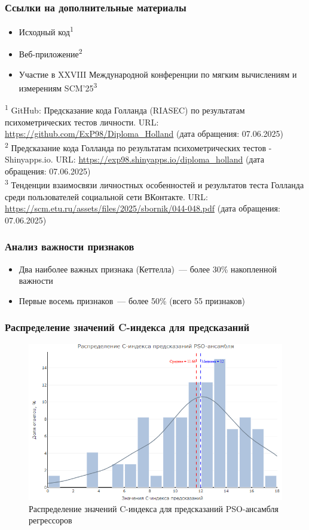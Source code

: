 \documentclass
  [ russian
  , aspectratio=169 %
  ] {beamer}
\begin{document}
\begin{frame}
    \frametitle{Ссылки на дополнительные материалы}
    \begin{itemize}
        \item Исходный код\textsuperscript{1}
        \item Веб-приложение\textsuperscript{2}
        \item Участие в XXVIII Международной конференции по мягким вычислениям и измерениям SCM'25\textsuperscript{3}
    \end{itemize}
    
    \btVFill
    {\footnotesize
        \textsuperscript{1} GitHub: Предсказание кода Голланда (RIASEC) по результатам психометрических тестов личности. URL: \url{https://github.com/ExP98/Diploma_Holland} (дата обращения: 07.06.2025)\\
        \vspace{0.2em}
        \textsuperscript{2} Предсказание кода Голланда по результатам психометрических тестов - Shinyapps.io. URL: \url{https://exp98.shinyapps.io/diploma_holland} (дата обращения: 07.06.2025)\\
        \vspace{0.2em}
        \textsuperscript{3} Тенденции взаимосвязи личностных особенностей и результатов теста Голланда среди пользователей социальной сети ВКонтакте. URL: \url{https://scm.etu.ru/assets/files/2025/sbornik/044-048.pdf} (дата обращения: 07.06.2025)
    }
\end{frame}


\begin{frame}
    \frametitle{Анализ важности признаков}
    
    \begin{itemize}
        \item Два наиболее важных признака (Кеттелла)~--- более 30\% накопленной важности
        \item Первые восемь признаков~--- более 50\% (всего 55 признаков)
    \end{itemize}
\end{frame}


\begin{frame}
    \frametitle{Распределение значений C-индекса для предсказаний}
    \begin{figure}
        \centering
        \includegraphics[width=0.65\linewidth]{figures/Cindex_distr_PSO_regr.png}
        \caption{Распределение значений C-индекса для предсказаний PSO-ансамбля регрессоров}
        \label{fig:cindex_distr}
    \end{figure}
\end{frame}
\end{document}
